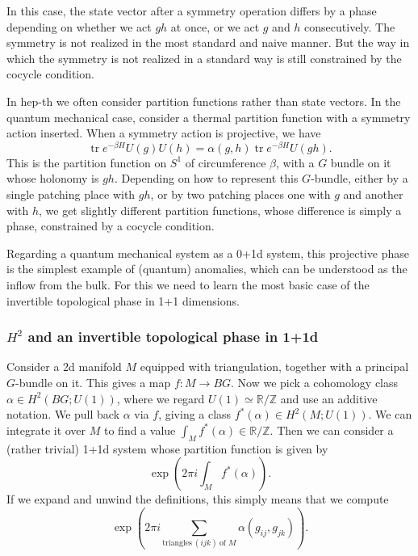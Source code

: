 \documentclass[12pt]{article}
\numberwithin{equation}{section}
\numberwithin{figure}{section}
\theoremstyle{remark}
\def\bR{\mathbb{R}}
\def\bZ{\mathbb{Z}}
\def\tr{\mathop{\mathrm{tr}}\nolimits}
\begin{document}
In this case, the state vector after a symmetry operation differs by a phase
depending on whether we act $gh$ at once,
or we act $g$ and $h$ consecutively.
The symmetry is not realized in the most standard and naive manner.
But the way in which the symmetry is not realized in a standard way
is still constrained by the cocycle condition.

In hep-th we often consider partition functions rather than state vectors.
In the quantum mechanical case, consider a thermal partition function
with a symmetry action inserted. 
When a symmetry action is projective, we have \begin{equation}
\tr e^{-\beta H} U(g) U(h) = 
\alpha(g,h) \tr e^{-\beta H} U(g h) .
\end{equation}
This is the partition function on $S^1$ of circumference $\beta$,
with a $G$ bundle on it whose holonomy is $gh$.
Depending on how to represent this $G$-bundle,
either by a single patching place with $gh$,
or by two patching places one with $g$ and another with $h$,
we get slightly different partition functions,
whose difference is simply a phase, constrained by a cocycle condition.



Regarding a quantum mechanical system as a 0+1d system,
this projective phase is the simplest example of (quantum) anomalies,
which can be understood as the inflow from the bulk.
For this we need to learn the most basic case of the invertible topological phase
in 1+1 dimensions.

\subsubsection{$H^2$ and an invertible topological phase in 1+1d}

Consider a 2d manifold $M$ equipped with triangulation,
together with a principal $G$-bundle on it.
This gives a map $f: M\to BG$.
Now we pick a cohomology class $\alpha \in H^2(BG;U(1))$,
where we regard $U(1)\simeq \bR/\bZ$ and use an additive notation.
We pull back $\alpha$ via $f$, giving a class $f^*(\alpha) \in H^2(M;U(1))$.
We can integrate it over $M$ to find a value $\int_M f^*(\alpha) \in \bR/\bZ$.
Then we can consider a (rather trivial) 1+1d system whose partition function is given by \begin{equation}
\exp(2\pi i \int_M f^*(\alpha)).
\end{equation}
If we expand and unwind the definitions, this simply means that we compute \begin{equation}
\exp\left(2\pi i \sum_{\text{triangles}\ (ijk)\ \text{of $M$}}  \alpha(g_{ij},g_{jk}) \right).
\end{equation}
\end{document}
